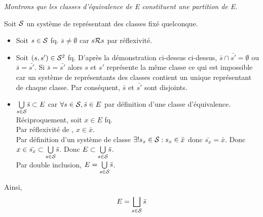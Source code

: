 \documentclass{article}
\begin{document}
\begin{question_kholle}
		\textit{Montrons que les classes d'équivalence de E constituent une partition de E.}
		
		Soit $\mathcal S$ un système de représentant des classes fixé quelconque.
		
		\begin{itemize}[label=\textemdash]
			\item Soit $s\in \mathcal S$ fq. $\bar{s} \neq \emptyset$ car $s \mathcal R s$ par réflexivité.
			\item Soit $(s, s') \in \mathcal S^2$ fq. D'après la démonstration ci-dessus ci-dessus, $\bar{s} \cap \bar{s'} = \emptyset$ ou $\bar{s} = \bar{s'}$. Si $\bar{s} = \bar{s'}$ alors $s$ et $s'$ représente la même classe ce qui est impossible car un système de représentants des classes contient un unique représentant de chaque classe. Par conséquent, $\bar{s}$ et $\bar{s'}$ sont disjoints.
			\item $\underset{s \in \mathcal S}{\bigcup} \bar{s} \subset E$ car $\forall s \in \mathcal S, \bar{s} \in E$ par définition d'une classe d'équivalence. \\
			Réciproquement, soit $x \in E$ fq. \\
			Par réflexivité de \Rel, $x \in \bar{x}$. \\
			Par définition d'un système de classe $\exists ! s_x \in \mathcal S : s_x \in \bar{x}$ donc $\bar{s_x} = \bar{x}$. Donc $x \in \bar{s_x} \subset \underset{s \in \mathcal S}{\bigcup} \bar{s}$. Donc $E \subset \underset{s \in \mathcal S}{\bigcup} \bar{s}$. \\
			Par double inclusion, $E = \underset{s \in \mathcal S}{\bigcup} \bar{s}$.			
		\end{itemize}
		
		Ainsi,
		\begin{equation}
			E = \bigsqcup_{s \in \mathcal S} \bar{s}
		\end{equation}
		
	\end{question_kholle}
\end{document}
